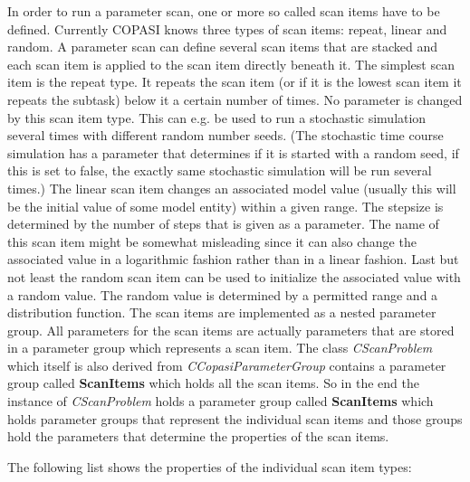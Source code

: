 \documentclass[a4,10pt]{article}
\begin{document}
In order to run a parameter scan, one or more so called scan items have to be defined. Currently COPASI knows three types of scan items: repeat, linear and random. A parameter scan can define several scan items that are stacked and each scan item is applied to the scan item directly beneath it. The simplest scan item is the repeat type. It repeats the scan item (or if it is the lowest scan item it repeats the subtask) below it a certain number of times. No parameter is changed by this scan item type. This can e.g. be used to run a stochastic simulation several times with different random number seeds. (The stochastic time course simulation has a parameter that determines if it is started with a random seed, if this is set to false, the exactly same stochastic simulation will be run several times.)
The linear scan item changes an associated model value (usually this will be the initial value of some model entity) within a given range. The stepsize is determined by the number of steps that is given as a parameter. The name of this scan item might be somewhat misleading since it can also change the associated value in a logarithmic fashion rather than in a linear fashion.
Last but not least the random scan item can be used to initialize the associated value with a random value. The random value is determined by a permitted range and a distribution function.
The scan items are implemented as a nested parameter group. All parameters for the scan items are actually parameters that are stored in a parameter group which represents a scan item.
The class \textit{CScanProblem} which itself is also derived from \textit{CCopasiParameterGroup} contains a parameter group called \textbf{ScanItems} which holds all the scan items.
So in the end the instance of \textit{CScanProblem} holds a parameter group called \textbf{ScanItems} which holds parameter groups that represent the individual scan items and those groups hold the parameters that determine the properties of the scan items.

The following list shows the properties of the individual scan item types:
\end{document}
